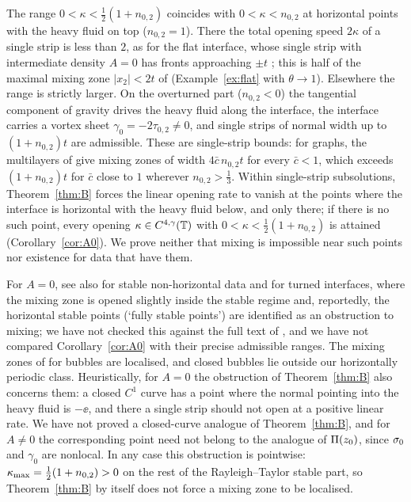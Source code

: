 The range $0<\kappa<\frac12(1+n_{0,2})$ coincides with $0<\kappa<n_{0,2}$ at horizontal points with the heavy fluid on top ($n_{0,2}=1$). There the total opening speed $2\kappa$ of a single strip is
less than $2$, as for the flat interface, whose single strip with intermediate density $A=0$ has fronts approaching $\pm t$ \cite[Sec.~3.2]{LM26}; this is half of the maximal mixing zone $|x_2|<2t$ of
\cite{Ott99,Sze12} (Example~\ref{ex:flat} with $\theta\to1$). Elsewhere the range is strictly larger. On the overturned part ($n_{0,2}<0$) the tangential component of gravity drives the heavy fluid along
the interface, the interface carries a vortex sheet $\gamma_0=-2\tau_{0,2}\neq0$, and single strips of normal width up to $(1+n_{0,2})t$ are admissible. These are single-strip bounds: for graphs, the
multilayers of \cite[Sec.~7.5]{LM26} give mixing zones of width $4\bar c\,n_{0,2}t$ for every $\bar c<1$, which exceeds $(1+n_{0,2})t$ for $\bar c$ close to $1$ wherever $n_{0,2}>\frac13$. Within
single-strip subsolutions, Theorem~\ref{thm:B} forces the linear opening rate to vanish at the points where the interface is horizontal with the heavy fluid below, and only there; if there is no such
point, every opening $\kappa\in C^{4,\gamma}(\mathbb{T})$ with $0<\kappa<\frac12(1+n_{0,2})$ is attained (Corollary~\ref{cor:A0}). We prove neither that mixing is impossible near such points nor existence for data
that have them.

For $A=0$, see also \cite{FS18} for stable non-horizontal data and \cite{CFM22} for turned interfaces, where the mixing zone is opened slightly inside the stable regime and, reportedly, the
horizontal stable points (`fully stable points') are identified as an obstruction to mixing; we have not checked this against the full text of \cite{CFM22}, and we have not compared
Corollary~\ref{cor:A0} with their precise admissible ranges. The mixing zones of
\cite{CFM22} for bubbles are localised, and closed bubbles lie outside our horizontally periodic class. Heuristically, for $A=0$ the obstruction of Theorem~\ref{thm:B} also concerns them: a closed $C^1$
curve has a point where the normal pointing into the heavy fluid is $-\ee$, and there a single strip should not open at a positive linear rate. We have not proved a closed-curve analogue of
Theorem~\ref{thm:B}, and for $A\ne0$ the corresponding point need not belong to the analogue of $\Pi(z_0)$, since $\sigma_0$ and $\gamma_0$ are nonlocal. In any case this obstruction is pointwise:
$\kappa_{\max}=\frac12(1+n_{0,2})>0$ on the rest of the Rayleigh--Taylor stable part, so Theorem~\ref{thm:B} by itself does not force a mixing zone to be localised.

